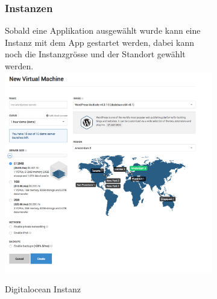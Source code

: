 \begin{figure}[!htbp]
   \begin{subfigure}[b]{.49\textwidth}
\subsubsection{Instanzen}
Sobald eine Applikation ausgewählt wurde kann eine Instanz mit dem App gestartet 
werden, dabei kann noch die Instanzgrösse und der Standort gewählt werden.
\includegraphics[width=\textwidth]{./03_Analyse/03_Bitnami/images/digitalocean_size}
\caption{Digitalocean Instanz}
\end{subfigure}
  \hfill
 \begin{subfigure}[b]{.49\textwidth}

\end{subfigure}
\end{figure}
